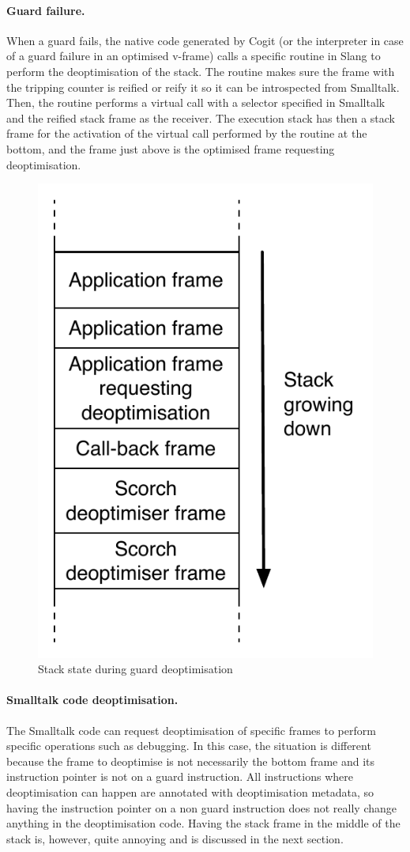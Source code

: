 \documentclass[a4paper,12pt,twoside]{../includes/ThesisStyle}
\begin{document}
\paragraph{Guard failure.} When a guard fails, the native code generated by Cogit (or the interpreter in case of a guard failure in an optimised v-frame) calls a specific routine in Slang to perform the deoptimisation of the stack. The routine makes sure the frame with the tripping counter is reified or reify it so it can be introspected from Smalltalk. Then, the routine performs a virtual call with a selector specified in Smalltalk and the reified stack frame as the receiver. The execution stack has then a stack frame for the activation of the virtual call performed by the routine at the bottom, and the frame just above is the optimised frame requesting deoptimisation. 

\begin{figure}[h!]
    \begin{center}
        \includegraphics[width=0.4\linewidth]{DeoptCallBackStack}
        \caption{Stack state during guard deoptimisation}
        \label{fig:DeoptCallBackStack}
    \end{center}
\end{figure}


\paragraph{Smalltalk code deoptimisation.}The Smalltalk code can request deoptimisation of specific frames to perform specific operations such as debugging. In this case, the situation is different because the frame to deoptimise is not necessarily the bottom frame and its instruction pointer is not on a guard instruction. All instructions where deoptimisation can happen are annotated with deoptimisation metadata, so having the instruction pointer on a non guard instruction does not really change anything in the deoptimisation code. Having the stack frame in the middle of the stack is, however, quite annoying and is discussed in the next section.
\end{document}
